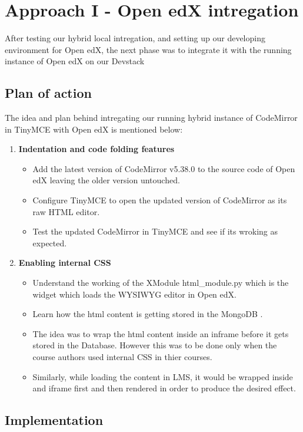 \chapter{Approach I - Open edX intregation}
After testing our hybrid local intregation, and setting up our developing environment for Open edX,
the next phase was to integrate it with the running instance of Open edX on our Devstack
\section{Plan of action}
The idea and plan behind intregating our running hybrid instance of CodeMirror in TinyMCE with
Open edX is mentioned below:
\begin{enumerate}
\item\textbf{Indentation and code folding features}
\begin{itemize}
\item Add the latest version of CodeMirror v5.38.0 to the source code of Open edX
leaving the older version untouched.
\item Configure TinyMCE to open the updated version of CodeMirror as its raw HTML
editor.
\item Test the updated CodeMirror in TinyMCE and see if its wroking as expected.
\end{itemize}
\item\textbf{Enabling internal CSS}
\begin{itemize}
\item Understand the working of the XModule html\_module.py which is the widget
which loads the WYSIWYG editor in Open edX.
\item Learn how the html content is getting stored in the MongoDB .
\item The idea was to wrap the html content inside an inframe before it gets stored in the
Database. However this was to be done only when the course authors used internal
CSS in thier courses.
\item Similarly, while loading the content in LMS, it would be wrapped inside and iframe
first and then rendered in order to produce the desired effect.
\end{itemize}
\end{enumerate}

\section{Implementation}
